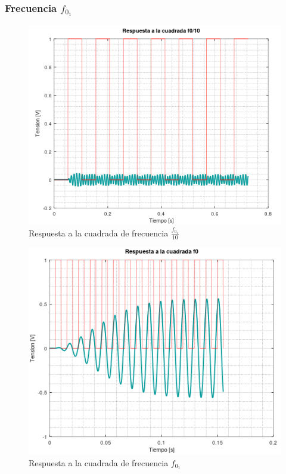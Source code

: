 \documentclass[11pt,a4paper]{report}
\begin{document}
\subsubsection*{Frecuencia $f_{0_{1}}$}

\begin{figure}[h!]
\includegraphics[scale=1]{RtaCuadradaWo11.png}
\caption{Respuesta a la cuadrada de frecuencia $\frac{f_{0_{1}}}{10}$}
\end{figure}

\newpage
\begin{figure}[h!]
\includegraphics[scale=1]{RtaCuadradaWo12.png}
\caption{Respuesta a la cuadrada de frecuencia $f_{0_{1}}$}
\end{figure}
\end{document}
